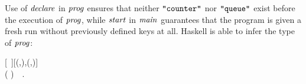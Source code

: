 Use of \ensuremath{\Varid{declare}} in \ensuremath{\Varid{prog}} ensures that neither \ensuremath{\text{\tt \char34 counter\char34}} nor \ensuremath{\text{\tt \char34 queue\char34}} exist
before the execution of \ensuremath{\Varid{prog}}, while \ensuremath{\Varid{start}} in \ensuremath{\Varid{main}} guarantees that the
program is given a fresh run without previously defined keys at all. Haskell
is able to infer the type of \ensuremath{\Varid{prog}}:
\begin{hscode}\SaveRestoreHook
{}%
%
%
\>[B]{}\mathbin{::}\;{}\<[15]%
\>[15]{}\mbox{\textquotesingle}[~]\;\mbox{\textquotesingle}[\mbox{\textquotesingle}(,),\mbox{\textquotesingle}(,\;)]\;{}\<[E]%
\\
\>[15]{}( \uplus {}\;)~~.{}\<[E]%
\ColumnHook
\end{hscode}\resethooks





